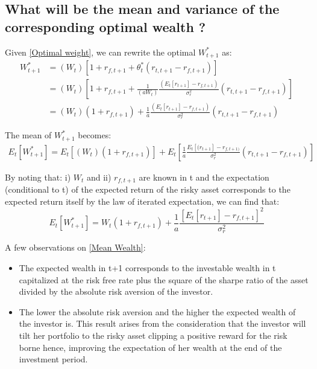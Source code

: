 \documentclass[12pt]{article}
\begin{document}
	\subsection{What will be the mean and variance of the corresponding optimal wealth ?} \label{Optimal Wealth}
	
	Given \ref{Optimal weight}, we can rewrite the optimal $W_{t+1}^{*}$ as: \vspace{-2.5em}\\
	
	\begin{align*}
		W_{t+1}^{*} &= (W_t) \left[1 + r_{f,t+1} + \theta_t^*(r_{t,t+1}-r_{f, t+1}) \right]\\
		&= (W_t) \left[1 + r_{f,t+1} + \frac{1}{(aW_t)}\frac{(E_{t}[r_{t+1}]-r_{f, t+1})}{\sigma_r^2}(r_{t,t+1}-r_{f, t+1}) \right]\\
		&= (W_t)(1 + r_{f,t+1}) + \frac{1}{a}\frac{(E_{t}[r_{t+1}]-r_{f, t+1})}{\sigma_r^2}(r_{t,t+1}-r_{f, t+1})
	\end{align*} \vspace{-1.25em}
	
	The mean of $W_{t+1}^{*}$ becomes:
	\begin{align*}
		E_{t}[W_{t+1}^{*}] = E_{t}[(W_t)(1 + r_{f,t+1})] + E_{t}[\frac{1}{a}\frac{E_{t}[(r_{t+1}]-r_{f, t+1)}}{\sigma_r^2}(r_{t,t+1}-r_{f, t+1})]
	\end{align*} \vspace{-1em}
	
	By noting that: i) $W_t$ and ii) $r_{f,t+1}$ are known in t and the expectation (conditional to t) of the expected return of the risky asset corresponds to the expected return itself by the law of iterated expectation, we can find that:    
	\begin{equation} \label{Mean Wealth}
		E_{t}[W_{t+1}^{*}] = W_t(1 + r_{f,t+1}) + \frac{1}{a}\frac{[E_{t}[r_{t+1}]-r_{f, t+1}]^2}{\sigma_r^2}
	\end{equation} \vspace{-1em}
	
	A few observations on \ref{Mean Wealth}:
	\begin{itemize}
		\item The expected wealth in t+1 corresponds to the investable wealth in t capitalized at the risk free rate plus the square of the sharpe ratio of the asset divided by the absolute risk aversion of the investor.
		\item The lower the absolute risk aversion and the higher the expected wealth of the investor is. This result arises from the consideration that the investor will tilt her portfolio to the risky asset clipping a positive reward for the risk borne hence, improving the expectation of her wealth at the end of the investment period.       
	\end{itemize}
	
\end{document}

